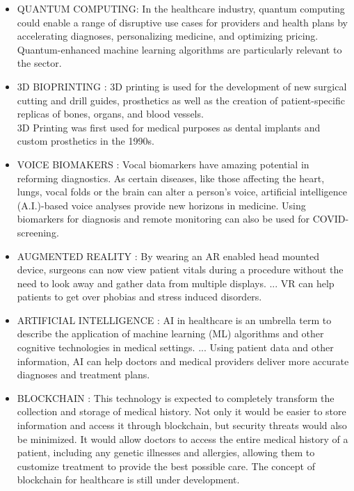 \documentclass[12pt]{article}
\begin{document}
\begin{itemize}
\item QUANTUM COMPUTING:  In the healthcare industry, quantum computing could enable a range of disruptive use cases for providers and health plans by accelerating diagnoses, personalizing medicine, and optimizing pricing. Quantum-enhanced machine learning algorithms are particularly relevant to the sector.

\item 3D BIOPRINTING :  3D printing is used for the development of new surgical cutting and drill guides, prosthetics as well as the creation of patient-specific replicas of bones, organs, and blood vessels.\\
3D Printing was first used for medical purposes as dental implants and custom prosthetics in the 1990s.

\item VOICE BIOMAKERS :  Vocal biomarkers have amazing potential in reforming diagnostics. As certain diseases, like those affecting the heart, lungs, vocal folds or the brain can alter a person’s voice, artificial intelligence (A.I.)-based voice analyses provide new horizons in medicine. Using biomarkers for diagnosis and remote monitoring can also be used for COVID-screening.

\item AUGMENTED REALITY :   By wearing an AR enabled head mounted device, surgeons can now view patient vitals during a procedure without the need to look away and gather data from multiple displays. ... VR can help patients to get over phobias and stress induced disorders.\\

\item ARTIFICIAL INTELLIGENCE :  AI in healthcare is an umbrella term to describe the application of machine learning (ML) algorithms and other cognitive technologies in medical settings. ... Using patient data and other information, AI can help doctors and medical providers deliver more accurate diagnoses and treatment plans.\\


\item  BLOCKCHAIN : This technology is expected to completely transform the collection and storage of medical history. Not only it would be easier to store information and access it through blockchain, but security threats would also be minimized. It would allow doctors to access the entire medical history of a patient, including any genetic illnesses and allergies, allowing them to customize treatment to provide the best possible care. The concept of blockchain for healthcare is still under development.\\



\end{itemize}
\end{document}
